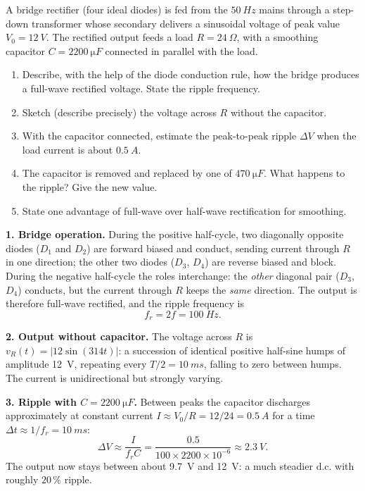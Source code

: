 \documentclass[11pt]{article}
\begin{document}
\begin{exoresolu}
A bridge rectifier (four ideal diodes) is fed from the $\SI{50}{Hz}$ mains through a step-down transformer whose secondary delivers a sinusoidal voltage of peak value $V_0 = \SI{12}{V}$. The rectified output feeds a load $R = \SI{24}{\Omega}$, with a smoothing capacitor $C = \SI{2200}{\micro F}$ connected in parallel with the load.
\begin{enumerate}
\item Describe, with the help of the diode conduction rule, how the bridge produces a full-wave rectified voltage. State the ripple frequency.
\item Sketch (describe precisely) the voltage across $R$ without the capacitor.
\item With the capacitor connected, estimate the peak-to-peak ripple $\Delta V$ when the load current is about $\SI{0.5}{A}$.
\item The capacitor is removed and replaced by one of $\SI{470}{\micro F}$. What happens to the ripple? Give the new value.
\item State one advantage of full-wave over half-wave rectification for smoothing.
\end{enumerate}
\tcblower
\textbf{1. Bridge operation.} During the positive half-cycle, two diagonally opposite diodes ($D_1$ and $D_2$) are forward biased and conduct, sending current through $R$ in one direction; the other two diodes ($D_3$, $D_4$) are reverse biased and block. During the negative half-cycle the roles interchange: the \emph{other} diagonal pair ($D_3$, $D_4$) conducts, but the current through $R$ keeps the \emph{same} direction. The output is therefore full-wave rectified, and the ripple frequency is
\[
f_r = 2f = \SI{100}{Hz}.
\]

\textbf{2. Output without capacitor.} The voltage across $R$ is $v_R(t) = |12\sin(314t)|$: a succession of identical positive half-sine humps of amplitude \SI{12}{V}, repeating every $T/2 = \SI{10}{ms}$, falling to zero between humps. The current is unidirectional but strongly varying.

\textbf{3. Ripple with $C = \SI{2200}{\micro F}$.} Between peaks the capacitor discharges approximately at constant current $I \approx V_0/R = 12/24 = \SI{0.5}{A}$ for a time $\Delta t \approx 1/f_r = \SI{10}{ms}$:
\[
\Delta V \approx \frac{I}{f_r C} = \frac{0.5}{100 \times 2200\times10^{-6}} \approx \SI{2.3}{V}.
\]
The output now stays between about \SI{9.7}{V} and \SI{12}{V}: a much steadier d.c. with roughly $20\,\%$ ripple.


\end{exoresolu}
\end{document}

